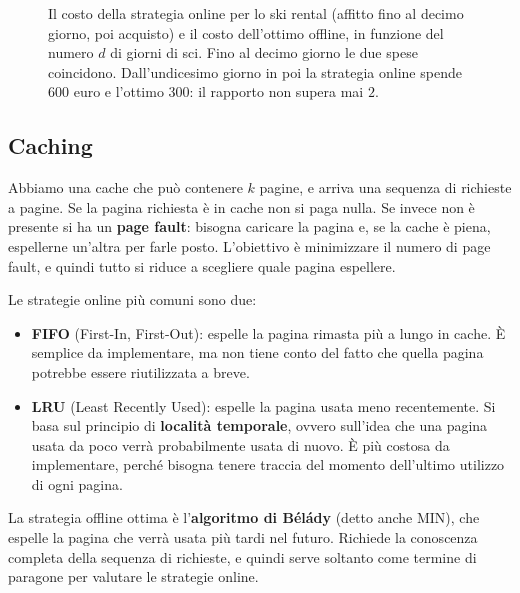\begin{figure}[htbp]
\centering
{}
\caption{Il costo della strategia online per lo ski rental (affitto fino al decimo giorno, poi acquisto) e il costo dell'ottimo offline, in funzione del numero $d$ di giorni di sci. Fino al decimo giorno le due spese coincidono. Dall'undicesimo giorno in poi la strategia online spende $600$ euro e l'ottimo $300$: il rapporto non supera mai $2$.}
\label{fig:ski}
\end{figure}

\subsection{Caching}\label{sec:caching}
Abbiamo una cache che può contenere $k$ pagine, e arriva una sequenza di richieste a pagine. Se la pagina richiesta è in cache non si paga nulla. Se invece non è presente si ha un \textbf{page fault}: bisogna caricare la pagina e, se la cache è piena, espellerne un'altra per farle posto. L'obiettivo è minimizzare il numero di page fault, e quindi tutto si riduce a scegliere quale pagina espellere.

Le strategie online più comuni sono due:
\begin{itemize}
    \item \textbf{FIFO} (First-In, First-Out): espelle la pagina rimasta più a lungo in cache. È semplice da implementare, ma non tiene conto del fatto che quella pagina potrebbe essere riutilizzata a breve.
    \item \textbf{LRU} (Least Recently Used): espelle la pagina usata meno recentemente. Si basa sul principio di \textbf{località temporale}, ovvero sull'idea che una pagina usata da poco verrà probabilmente usata di nuovo. È più costosa da implementare, perché bisogna tenere traccia del momento dell'ultimo utilizzo di ogni pagina.
\end{itemize}
La strategia offline ottima è l'\textbf{algoritmo di Bélády} (detto anche MIN), che espelle la pagina che verrà usata più tardi nel futuro. Richiede la conoscenza completa della sequenza di richieste, e quindi serve soltanto come termine di paragone per valutare le strategie online.

